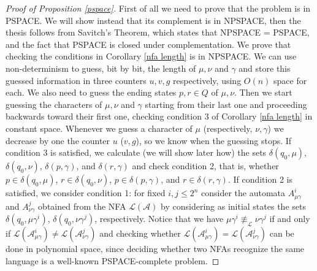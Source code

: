 \documentclass[runningheads]{llncs}
\newcommand{\gr}[1]{{\color{cgreen} #1}}
\newcommand{\la}[1]{\mathcal L(\mathcal #1)}
\begin{document}
\begin{proof}[\noindent Proof of Proposition \ref{pspace}]
First of all we need to prove that the problem is in PSPACE. We will show instead that its complement is in NPSPACE, then the thesis follows from Savitch's Theorem, which states that NPSPACE = PSPACE, and the fact that PSPACE is closed under complementation. 
We  prove that checking  the conditions in Corollary \ref{nfa length} is in NPSPACE. %
 We can use non-determinism to guess, bit by bit, the length of $\mu, \nu$ and $\gamma$ and store this guessed information in three counters $u, v, g$ respectively, using $O(n)$ space for each. We also need to guess  the ending states $p,r \in Q$  of $\mu, \nu$. Then we start    guessing  the  characters of $\mu, \nu$ and $\gamma$ starting from their last one and proceeding backwards toward their first one, checking condition 3 of Corollary \ref{nfa length} in constant space. Whenever we guess a character of $\mu$ (respectively, $\nu,\gamma$) we decrease by one the counter $u$ ($v,g$), so we know when the guessing stops. If condition 3 is satisfied, we calculate (we will show later how) the sets
 $\delta(q_0, \mu)$, $\delta(q_0, \nu)$, $\delta(p, \gamma)$, and $\delta(r, \gamma)$ and check condition 2, that is, whether $p\in \delta(q_0, \mu)$, $r\in \delta(q_0, \nu)$, $p\in \delta(p, \gamma)$, and $r\in \delta(r, \gamma)$.
 If condition 2 is satisfied, we consider condition 1: for fixed $i,j\leq 2^n$ consider the automata $A^i_{\mu\gamma}$ and $A^j_{\nu\gamma}$ obtained from the NFA $\la A$ by considering as initial states the sets  $\delta(q_0, \mu\gamma^i)$,  $\delta(q_0, \nu\gamma^j)$, respectively. Notice that  we have  $\mu\gamma^i \not\equiv_{\mathcal L} \nu\gamma^j$ if and only if  $\la{A^i_{\mu\gamma}} \neq \la{A^j_{\nu\gamma}}$ and   checking whether $\la{A^i_{\mu\gamma}} = \la{A^j_{\nu\gamma}}$ can be done in polynomial space, since deciding whether two NFAs recognize the same language is a well-known PSPACE-complete problem.
 

\end{proof}
\end{document}
